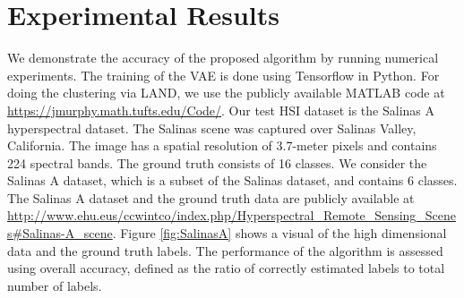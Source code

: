 \documentclass{article}
\begin{document}
\section{Experimental Results}
\label{sec:Experiments}
We demonstrate the accuracy of the proposed algorithm by running numerical experiments. The training of the VAE is done using Tensorflow in Python. For doing the clustering via LAND, we use the publicly available MATLAB code 
at  \url{https://jmurphy.math.tufts.edu/Code/}. Our test HSI dataset is the Salinas A hyperspectral dataset. The Salinas scene was captured over Salinas Valley, California. The image has a spatial resolution of 3.7-meter pixels and contains 224 spectral bands. The ground truth consists of 16 classes. We consider the Salinas A dataset, which is a subset of the Salinas dataset, and contains 6 classes. The Salinas A dataset and the ground truth data are publicly available at \url{http://www.ehu.eus/ccwintco/index.php/Hyperspectral_Remote_Sensing_Scenes#Salinas-A_scene}. Figure \ref{fig:SalinasA} shows a visual of the high dimensional data and the ground truth labels. The performance of the algorithm is assessed using overall accuracy, defined as the ratio of correctly estimated labels to total number of labels. 
\end{document}
